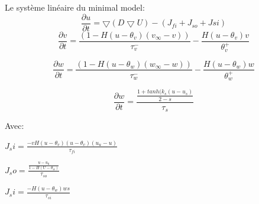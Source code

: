 \documentclass[a4paper,12pt,twoside]{report}
\begin{document}
Le système linéaire du minimal model: 
\begin{equation}
\frac{\partial u}{\partial t}=\bigtriangledown( D \bigtriangledown U )-(J_{fi}+J_{so}+	J{si})
\end{equation}
\begin{equation}
\frac{\partial v}{\partial t}=\frac{(1-H(u-\theta_v)(v_\infty -v))}{\tau_v^-}-\frac{H(u-\theta_v)v}{\theta_v^+}
\end{equation}

\begin{equation}
\frac{\partial w}{\partial t}=\frac{(1-H(u-\theta_w)(w_\infty -w))}{\tau_w^-}-\frac{H(u-\theta_w)w}{\theta_w^+}
\end{equation}

\begin{equation}
\frac{\partial w}{\partial t}=\frac{\frac{1+tanh(k_s(u-u_s)}{2-s}}{\tau_s}
\end{equation}

Avec:

$J_si=\frac{-vH(u-\theta_v)(u-\theta_v)(u_u-u)}{\tau_{fi}}$


$J_so=\frac{\frac{u-u_0}{1-H(U-\theta_w)}}{\tau_{so}}$


$J_si=\frac{-H(u-\theta_w)ws}{\tau_{si}}$
\end{document}
